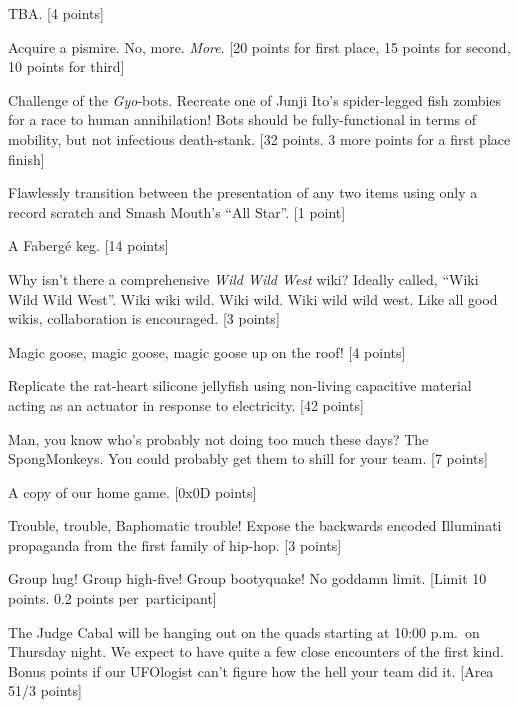\documentclass{book}
\begin{document}
\begin{list}{}{}
\item TBA. [4 points] 

\item Acquire a pismire. No, more. \emph{More}.  [20 points for first place, 15 points for second, 10 points for third]

\item Challenge of the \emph{Gyo}-bots. Recreate one of Junji Ito's spider-legged fish zombies for a race to human annihilation! Bots should be fully-functional in terms of mobility, but not infectious death-stank.  [32 points. 3 more points for a first place finish]

\item Flawlessly transition between the presentation of any two items using only a record scratch and Smash Mouth's ``All Star''.  [1 point]

\item A Faberg\'{e} keg.  [14 points]

\item Why isn't there a comprehensive \emph{Wild Wild West} wiki? Ideally called, ``Wiki Wild Wild West''. Wiki wiki wild. Wiki wild. Wiki wild wild west. Like all good wikis, collaboration is encouraged. [3 points]

\item Magic goose, magic goose, magic goose up on the roof!    [4 points]

\item Replicate the rat-heart silicone jellyfish using non-living capacitive material acting as an actuator in response to electricity. [42 points]

\item Man, you know who's probably not doing too much these days? The SpongMonkeys. You could probably get them to shill for your team.  [7 points]

\item A copy of our home game. [0x0D points]

\item Trouble, trouble, Baphomatic trouble! Expose the backwards encoded Illuminati propaganda from the first family of hip-hop.  [3 points]

\item Group hug! Group high-five! Group bootyquake! No goddamn limit. [Limit 10 points. 0.2 points per~participant]

\item The Judge Cabal will be hanging out on the quads starting at 10:00 p.m.\ on Thursday night. We expect to have quite a few close encounters of the first kind. Bonus points if our UFOlogist can't figure how the hell your team did it.   [Area 51/3 points]


\end{list}
\end{document}
